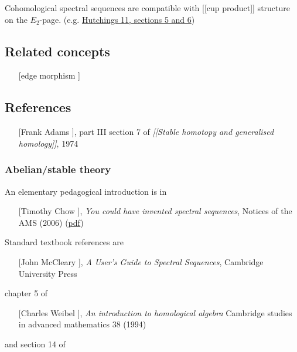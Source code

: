 \documentclass[12pt,titlepage]{article}
\theoremstyle{plain}
\theoremstyle{definition}
\theoremstyle{remark}
\begin{document}
Cohomological spectral sequences are compatible with [[cup product]] structure on the $E_2$-page. (e.g. \hyperlink{Hutchings11}{Hutchings 11, sections 5 and 6})

\hypertarget{related_concepts}{}\subsection*{{Related concepts}}\label{related_concepts}

\begin{itemize}%
\item [[edge morphism]]

\end{itemize}
\hypertarget{references}{}\subsection*{{References}}\label{references}

\begin{itemize}%
\item [[Frank Adams]], part III section 7 of \emph{[[Stable homotopy and generalised homology]]}, 1974

\end{itemize}
\hypertarget{abelianstable_theory}{}\subsubsection*{{Abelian/stable theory}}\label{abelianstable_theory}

An elementary pedagogical introduction is in

\begin{itemize}%
\item [[Timothy Chow]], \emph{You could have invented spectral sequences}, Notices of the AMS (2006) (\href{http://www.ams.org/notices/200601/fea-chow.pdf}{pdf})

\end{itemize}
Standard textbook references are

\begin{itemize}%
\item [[John McCleary]], \emph{A User's Guide to Spectral Sequences}, Cambridge University Press

\end{itemize}
chapter 5 of

\begin{itemize}%
\item [[Charles Weibel]], \emph{An introduction to homological algebra} Cambridge studies in advanced mathematics 38 (1994)

\end{itemize}
and section 14 of
\end{document}
